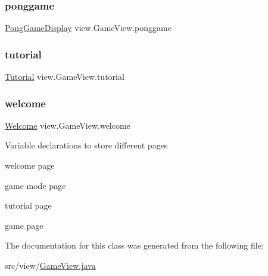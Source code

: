 \hypertarget{classview_1_1_game_view_a40ab8540fabeed491fc81dce3e801370}{}\label{classview_1_1_game_view_a40ab8540fabeed491fc81dce3e801370} 
\subsubsection{\texorpdfstring{ponggame}{ponggame}}
{\footnotesize\ttfamily \hyperlink{classview_1_1_pong_game_display}{Pong\+Game\+Display} view.\+Game\+View.\+ponggame\hspace{0.3cm}{\ttfamily [private]}}

\hypertarget{classview_1_1_game_view_a6bc586b3b4e3079253f50adb03864264}{}\label{classview_1_1_game_view_a6bc586b3b4e3079253f50adb03864264} 
\subsubsection{\texorpdfstring{tutorial}{tutorial}}
{\footnotesize\ttfamily \hyperlink{classview_1_1_tutorial}{Tutorial} view.\+Game\+View.\+tutorial\hspace{0.3cm}{\ttfamily [private]}}

\hypertarget{classview_1_1_game_view_a473510516d38bd1b016321b06962f0b0}{}\label{classview_1_1_game_view_a473510516d38bd1b016321b06962f0b0} 
\subsubsection{\texorpdfstring{welcome}{welcome}}
{\footnotesize\ttfamily \hyperlink{classview_1_1_welcome}{Welcome} view.\+Game\+View.\+welcome\hspace{0.3cm}{\ttfamily [private]}}

Variable declarations to store different pages
\begin{DoxyItemize}
\item welcome page
\item game mode page
\item tutorial page
\item game page 
\end{DoxyItemize}

The documentation for this class was generated from the following file\+:\begin{DoxyCompactItemize}
\item 
src/view/\hyperlink{_game_view_8java}{Game\+View.\+java}\end{DoxyCompactItemize}
